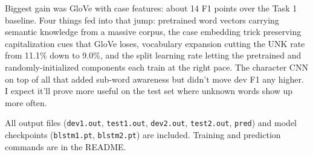 \documentclass[11pt]{article}
\begin{document}
Biggest gain was GloVe with case features: about 14 F1 points over the Task 1 baseline. Four things fed into that jump: pretrained word vectors carrying semantic knowledge from a massive corpus, the case embedding trick preserving capitalization cues that GloVe loses, vocabulary expansion cutting the UNK rate from 11.1\% down to 9.0\%, and the split learning rate letting the pretrained and randomly-initialized components each train at the right pace. The character CNN on top of all that added sub-word awareness but didn't move dev F1 any higher. I expect it'll prove more useful on the test set where unknown words show up more often.

All output files (\texttt{dev1.out}, \texttt{test1.out}, \texttt{dev2.out}, \texttt{test2.out}, \texttt{pred}) and model checkpoints (\texttt{blstm1.pt}, \texttt{blstm2.pt}) are included. Training and prediction commands are in the README.
\end{document}
